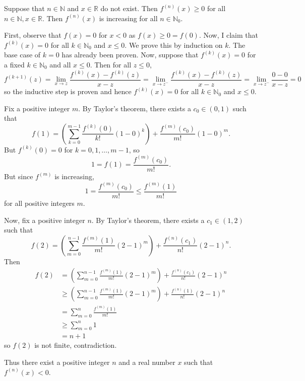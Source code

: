 Suppose that $n\in\mathbb{N}$ and $x\in\mathbb{R}$ do not exist. Then $f^{\left(n\right)}\left(x\right)\geq0$ for all $n\in\mathbb{N},x\in\mathbb{R}$. Then $f^{\left(n\right)}\left(x\right)$ is increasing for all $n\in\mathbb{N}_0$.

First, observe that $f\left(x\right)=0$ for $x<0$ as $f\left(x\right)\geq0=f\left(0\right)$. Now, I claim that $f^{\left(k\right)}\left(x\right)=0$ for all $k\in\mathbb{N}_0$ and $x\leq0$. We prove this by induction on $k$. The base case of $k=0$ has already been proven. Now, suppose that $f^{\left(k\right)}\left(x\right)=0$ for a fixed $k\in\mathbb{N}_0$ and all $x\leq0$. Then for all $z\leq0$, \[f^{\left(k+1\right)}\left(z\right)=\displaystyle\lim_{x\to z}\frac{f^{\left(k\right)}\left(x\right)-f^{\left(k\right)}\left(z\right)}{x-z}=\displaystyle\lim_{x\to z^-}\frac{f^{\left(k\right)}\left(x\right)-f^{\left(k\right)}\left(z\right)}{x-z}=\displaystyle\lim_{x\to z^-}\frac{0-0}{x-z}=0\] so the inductive step is proven and hence $f^{\left(k\right)}\left(x\right)=0$ for all $k\in\mathbb{N}_0$ and $x\leq0$.

Fix a positive integer $m$. By Taylor's theorem, there exists a $c_0\in\left(0,1\right)$ such that \[f\left(1\right)=\left(\displaystyle\sum_{k=0}^{m-1}\frac{f^{\left(k\right)}\left(0\right)}{k!}\left(1-0\right)^k\right)+\frac{f^{\left(m\right)}\left(c_0\right)}{m!}\left(1-0\right)^m.\] But $f^{\left(k\right)}\left(0\right)=0$ for $k=0,1,\ldots,m-1$, so \[1=f\left(1\right)=\frac{f^{\left(m\right)}\left(c_0\right)}{m!}.\] But since $f^{\left(m\right)}$ is increasing, \[1=\frac{f^{\left(m\right)}\left(c_0\right)}{m!}\leq\frac{f^{\left(m\right)}\left(1\right)}{m!}\] for all positive integers $m$.

Now, fix a positive integer $n$. By Taylor's theorem, there exists a $c_1\in\left(1,2\right)$ such that \[f\left(2\right)=\left(\displaystyle\sum_{m=0}^{n-1}\frac{f^{\left(m\right)}\left(1\right)}{m!}\left(2-1\right)^m\right)+\frac{f^{\left(n\right)}\left(c_1\right)}{n!}\left(2-1\right)^n.\] Then
\begin{align*}
	f\left(2\right)&=\left(\displaystyle\sum_{m=0}^{n-1}\frac{f^{\left(m\right)}\left(1\right)}{m!}\left(2-1\right)^m\right)+\frac{f^{\left(n\right)}\left(c_1\right)}{n!}\left(2-1\right)^n\\
	&\geq\left(\displaystyle\sum_{m=0}^{n-1}\frac{f^{\left(m\right)}\left(1\right)}{m!}\left(2-1\right)^m\right)+\frac{f^{\left(n\right)}\left(1\right)}{n!}\left(2-1\right)^n\\
	&=\displaystyle\sum_{m=0}^n\frac{f^{\left(m\right)}\left(1\right)}{m!}\\
	&\geq\displaystyle\sum_{m=0}^n1\\
	&=n+1
\end{align*}
so $f\left(2\right)$ is not finite, contradiction.

Thus there exist a positive integer $n$ and a real number $x$ such that $f^{\left(n\right)}\left(x\right)<0$.